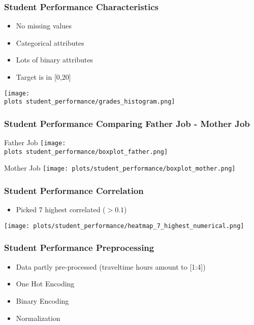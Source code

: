\documentclass[aspectratio=169]{beamer}
\def \plots {./plots/}
\begin{document}
\begin{frame}{}
\frametitle{Student Performance Characteristics}
\begin{minipage}{0.45\textwidth}
\begin{itemize}
\item No missing values
\item Categorical attributes
\item Lots of binary attributes
\item Target is in [0,20]
\end{itemize}
\end{minipage}
\begin{minipage}{0.5\textwidth}
    \texttt{[image: \\plots student\_performance/grades\_histogram.png]}
\end{minipage}
\end{frame}

\begin{frame}{}
\frametitle{Student Performance Comparing Father Job - Mother Job}
\begin{minipage}{0.49\textwidth}
	\center Father Job
    \texttt{[image: \\plots student\_performance/boxplot\_father.png]}
\end{minipage}
\begin{minipage}{0.49\textwidth}
	\center Mother Job
    \texttt{[image: plots/student\_performance/boxplot\_mother.png]}
\end{minipage}
\end{frame}

\begin{frame}{}
\frametitle{Student Performance Correlation}
\begin{minipage}{0.3\textwidth}
\begin{itemize}
\item Picked 7 highest correlated ($> 0.1$)
\end{itemize}
\end{minipage}
\begin{minipage}{0.69\textwidth}
    \texttt{[image: plots/student\_performance/heatmap\_7\_highest\_numerical.png]}
\end{minipage}
\end{frame}

\begin{frame}{}
\frametitle{Student Performance Preprocessing}
\begin{minipage}{0.99\textwidth}
\begin{itemize}
\item Data partly pre-processed (traveltime hours amount to [1:4])
\item One Hot Encoding
\item Binary Encoding
\item Normalization
\end{itemize}
\end{minipage}
\end{frame}
\end{document}

